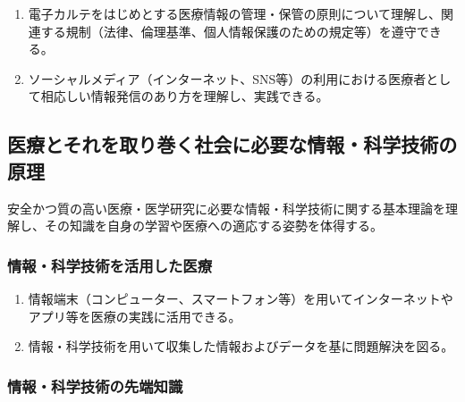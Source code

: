 \begin{enumerate}
\def\labelenumi{\arabic{enumi}.}
\tightlist
\item
  電子カルテをはじめとする医療情報の管理・保管の原則について理解し、関連する規制（法律、倫理基準、個人情報保護のための規定等）を遵守できる。
\item
  ソーシャルメディア（インターネット、SNS等）の利用における医療者として相応しい情報発信のあり方を理解し、実践できる。
\end{enumerate}

\hypertarget{ux533bux7642ux3068ux305dux308cux3092ux53d6ux308aux5dfbux304fux793eux4f1aux306bux5fc5ux8981ux306aux60c5ux5831ux79d1ux5b66ux6280ux8853ux306eux539fux7406}{%
\subsection{医療とそれを取り巻く社会に必要な情報・科学技術の原理}\label{ux533bux7642ux3068ux305dux308cux3092ux53d6ux308aux5dfbux304fux793eux4f1aux306bux5fc5ux8981ux306aux60c5ux5831ux79d1ux5b66ux6280ux8853ux306eux539fux7406}}

安全かつ質の高い医療・医学研究に必要な情報・科学技術に関する基本理論を理解し、その知識を自身の学習や医療への適応する姿勢を体得する。

\hypertarget{ux60c5ux5831ux79d1ux5b66ux6280ux8853ux3092ux6d3bux7528ux3057ux305fux533bux7642}{%
\subsubsection{情報・科学技術を活用した医療}\label{ux60c5ux5831ux79d1ux5b66ux6280ux8853ux3092ux6d3bux7528ux3057ux305fux533bux7642}}

\begin{enumerate}
\def\labelenumi{\arabic{enumi}.}
\tightlist
\item
  情報端末（コンピューター、スマートフォン等）を用いてインターネットやアプリ等を医療の実践に活用できる。
\item
  情報・科学技術を用いて収集した情報およびデータを基に問題解決を図る。
\end{enumerate}

\hypertarget{ux60c5ux5831ux79d1ux5b66ux6280ux8853ux306eux5148ux7aefux77e5ux8b58}{%
\subsubsection{情報・科学技術の先端知識}\label{ux60c5ux5831ux79d1ux5b66ux6280ux8853ux306eux5148ux7aefux77e5ux8b58}}

